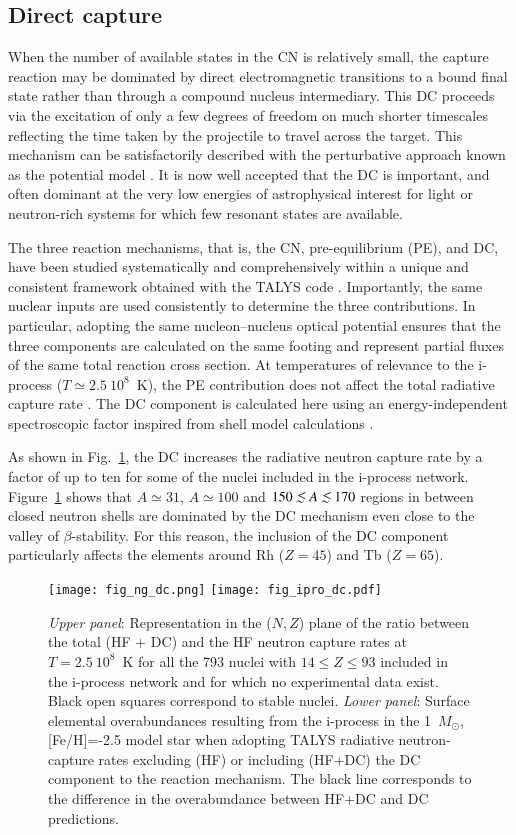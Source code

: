 \documentclass{aa}
\def\la{\,\,\raise0.14em\hbox{$<$}\kern-0.76em\lower0.28em\hbox{$\sim$}\,\,}
\def\Msun{$M_{\odot}$}
\begin{document}
\subsection{Direct capture}
\label{sect_dc}

When the number of available states in the CN is relatively small, the capture reaction may be dominated by direct electromagnetic transitions to a bound final state rather than through a compound nucleus intermediary. This DC proceeds via the excitation of only a few degrees of freedom on much shorter timescales reflecting the time taken by the projectile to travel across the target. This mechanism can be satisfactorily described with the perturbative approach known as the potential model \citep{Lynn68,Xu14}. It is now well accepted that the DC is important, and often dominant at the very low energies of astrophysical interest for light or neutron-rich systems for which few resonant states are available.

The three reaction mechanisms, that is, the CN, pre-equilibrium (PE), and DC,  have been studied systematically and comprehensively within a unique and consistent framework obtained with the {\sf TALYS} code \citep{Xu14}.  Importantly, the same nuclear inputs are used consistently to determine the three contributions. In particular, adopting the same nucleon--nucleus optical potential ensures that the three components are calculated on the same footing and represent partial fluxes of the same total reaction cross section. At  temperatures of relevance to the i-process ($T\simeq 2.5~10^8$~K), the PE contribution does not affect the total radiative capture rate \citep{Goriely08a}. The DC component is calculated here using an energy-independent spectroscopic factor inspired from shell model calculations \citep{Sieja21}.

As shown in Fig.~\ref{fig_ng_dc}, the DC increases the radiative neutron capture rate by a factor of up to ten for some of the nuclei included in the i-process network. Figure~\ref{fig_ng_dc} shows that $A\simeq 31$, $A\simeq 100$ and $150 \la A \la 170$ regions in between closed neutron shells are dominated by the DC mechanism even close to the valley of $\beta$-stability. For this reason, the inclusion of the DC component particularly affects the elements around Rh ($Z=45$) and Tb ($Z=65$).
\begin{figure}
\texttt{[image: fig\_ng\_dc.png]}
\texttt{[image: fig\_ipro\_dc.pdf]}
\caption{{\it Upper panel}: Representation in the ($N,Z$) plane of the ratio between the total (HF + DC) and the HF neutron
capture rates at $T = 2.5~10^8$~K for all the 793 nuclei with $14 \le Z \le 93$ included in the i-process network and
for which no experimental data exist. Black open squares correspond to stable nuclei.
{\it Lower panel}: Surface elemental overabundances resulting from the i-process in the 1~\Msun{}, [Fe/H]=-2.5 model star when adopting {\sf TALYS} radiative neutron-capture rates excluding (HF) or including (HF+DC) the DC component to the reaction mechanism. The black line corresponds to the difference in the overabundance between HF+DC and DC predictions.
}
\label{fig_ng_dc}
\end{figure}
\end{document}
